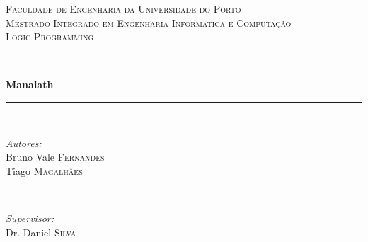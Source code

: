 \documentclass[12pt]{article}
\begin{document}
\begin{titlepage}

\newcommand{\HRule}{\rule{\linewidth}{0.25mm}} %

\center %


\textsc{\LARGE Faculdade de Engenharia da Universidade do Porto}\\[0.5cm] %
\textsc{\Large Mestrado Integrado em Engenharia Informática e Computação}\\[0.5cm] %
\textsc{\large Logic Programming}\\[0.5cm] %


\HRule \\[0.75cm]
{ \huge \bfseries Manalath}\\[0.4cm] %
\HRule \\[1cm]


\begin{minipage}{0.6\textwidth}
\begin{flushleft} \large
\emph{Autores:}\\
Bruno Vale \textsc{Fernandes}\\
Tiago \textsc{Magalhães}\\

\end{flushleft}
\end{minipage}
~
\begin{minipage}{0.35\textwidth}
\begin{flushright} \large
\emph{Supervisor:} \\
Dr. Daniel \textsc{Silva} %
\end{flushright}
\end{minipage}\\[1cm]


\end{titlepage}
\end{document}
